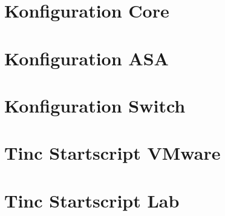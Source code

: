 \documentclass[11pt,a4paper,parskip=half]{scrartcl}
\begin{document}
\newpage
\appendix
{}
{}
\section{Konfiguration Core}

\newpage

\section{Konfiguration ASA}

\newpage

\section{Konfiguration Switch}

\newpage

\section{Tinc Startscript VMware}
\label{app:tinc-start-esx}

\newpage

\section{Tinc Startscript Lab}
\label{app:tinc-start-lab}

\newpage
\end{document}
